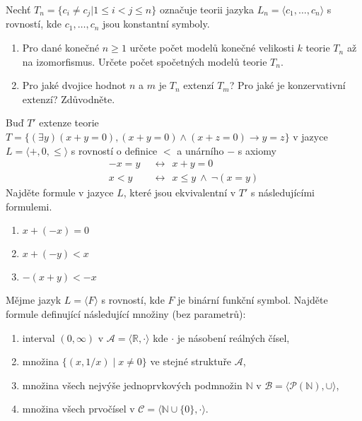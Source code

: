 \documentclass[a4paper,12pt]{article}
\begin{document}
\medskip\begin{problem}
Nechť $T_n = \{c_i \neq c_j | 1 \leq i < j \leq n\}$ označuje teorii jazyka $L_n = \langle c_1, \dots, c_n \rangle$ s rovností, kde $c_1, \dots, c_n$ jsou konstantní symboly.
\begin{enumerate}    
    \item Pro dané konečné $n \geq 1$ určete počet modelů konečné velikosti $k$ teorie $T_n$ až na izomorfismus. Určete počet spočetných modelů teorie $T_n$. 
    \item Pro jaké dvojice hodnot $n$ a $m$ je $T_n$ extenzí $T_m$? Pro jaké je konzervativní extenzí? Zdůvodněte.
\end{enumerate}
\end{problem}


\medskip\begin{problem}
Buď $T'$ extenze teorie $T=\{(\exists y)(x+y=0),(x+y=0)\wedge (x+z=0)\rightarrow y=z\}$ v jazyce $L=\langle +,0,\le\rangle$ s rovností o definice $<$ a unárního $-$ s axiomy
\begin{align*}
    -x=y\ \ &\leftrightarrow\ \ x+y=0\\
    x<y\ \ &\leftrightarrow\ \ x\le y\ \wedge\ \neg(x=y)
\end{align*}
Najděte formule v jazyce $L$, které jsou ekvivalentní v $T'$ s následujícími formulemi.
\begin{enumerate}    
    \item $x+(-x)=0$
    \item $x+(-y)<x$
    \item $-(x+y)<-x$
\end{enumerate}
\end{problem}


\medskip\begin{problem}
Mějme jazyk $L=\langle F \rangle$ s rovností, kde $F$ je binární funkční symbol. Najděte formule definující následující množiny (bez parametrů):
\begin{enumerate}
    \item interval $(0,\infty)$ v $\mathcal A=\langle\mathbb R, \cdot\rangle$ kde $\cdot$ je násobení reálných čísel,
    \item množina $\{(x, 1/x)\mid x\neq 0\}$ ve stejné struktuře $\mathcal A$,
    \item množina všech nejvýše jednoprvkových podmnožin $\mathbb N$ v $\mathcal B=\langle\mathcal P(\mathbb N),\cup\rangle$,
    \item množina všech prvočísel v $\mathcal C=\langle \mathbb N\cup\{0\}, \cdot\rangle$.
\end{enumerate}
\end{problem}
\end{document}
